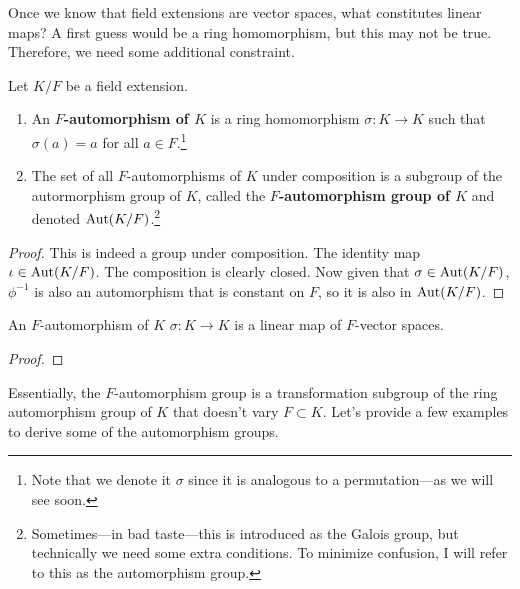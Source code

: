   Once we know that field extensions are vector spaces, what constitutes linear maps? A first guess would be a ring homomorphism, but this may not be true. Therefore, we need some additional constraint. 

  \begin{definition}
    Let $K/F$ be a field extension. 
    \begin{enumerate}
      \item An \textbf{$F$-automorphism of $K$} is a ring homomorphism $\sigma: K \to K$ such that $\sigma(a) = a$ for all $a \in F$.\footnote{Note that we denote it $\sigma$ since it is analogous to a permutation---as we will see soon.}
      \item The set of all $F$-automorphisms of $K$ under composition is a subgroup of the autormorphism group of $K$, called the \textbf{$F$-automorphism group of $K$} and denoted $\Aut(K/F)$.\footnote{Sometimes---in bad taste---this is introduced as the Galois group, but technically we need some extra conditions. To minimize confusion, I will refer to this as the automorphism group.}
    \end{enumerate}
  \end{definition}
  \begin{proof}
    This is indeed a group under composition. The identity map $\iota \in \Aut(K/F)$. The composition is clearly closed. Now given that $\sigma \in \Aut(K/F)$, $\phi^{-1}$ is also an automorphism that is constant on $F$, so it is also in $\Aut(K/F)$. 
  \end{proof}

  \begin{lemma}
    An $F$-automorphism of $K$ $\sigma: K \to K$ is a linear map of $F$-vector spaces. 
  \end{lemma}
  \begin{proof}
    
  \end{proof}

  Essentially, the $F$-automorphism group is a transformation subgroup of the ring automorphism group of $K$ that doesn't vary $F \subset K$. Let's provide a few examples to derive some of the automorphism groups. 

